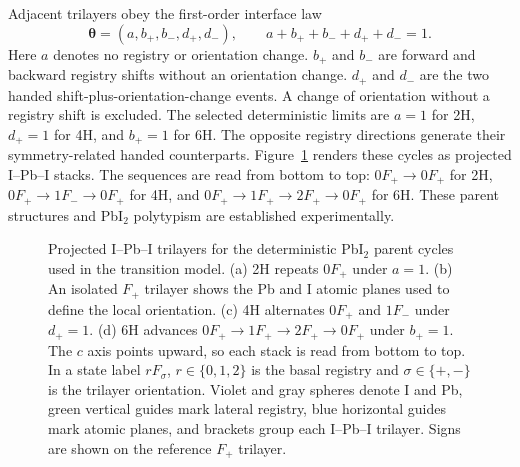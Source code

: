 Adjacent trilayers obey the first-order interface law
\begin{equation}
  \boldsymbol{\theta}=(a,b_+,b_-,d_+,d_-),\qquad
  a+b_++b_-+d_++d_-=1.
  \label{eq:pbi2_transition_probabilities}
\end{equation}
Here $a$ denotes no registry or orientation change. $b_+$ and $b_-$ are
forward and backward registry shifts without an orientation change.
$d_+$ and $d_-$ are the two handed shift-plus-orientation-change events.  A
change of orientation without a registry shift is excluded.  The selected
deterministic limits are $a=1$ for 2H, $d_+=1$ for 4H, and $b_+=1$ for 6H.
The opposite registry directions generate their symmetry-related handed
counterparts.  Figure~\ref{fig:pbi2_transition_states} renders these cycles as
projected I--Pb--I stacks. The sequences are read from bottom to top: $0F_+\rightarrow0F_+$ for 2H,
$0F_+\rightarrow1F_-\rightarrow0F_+$ for 4H, and
$0F_+\rightarrow1F_+\rightarrow2F_+\rightarrow0F_+$ for 6H.  These parent
structures and PbI$_2$ polytypism are established experimentally.\cite{Minagawa1975,Palosz1990}

\begin{figure}[H]
	\centering
	\resizebox{0.88\linewidth}{!}{%
	}
	\caption{Projected I--Pb--I trilayers for the deterministic PbI$_2$ parent
		cycles used in the transition model. (a) 2H repeats $0F_+$ under $a=1$.
		(b) An isolated $F_+$ trilayer shows the Pb and I atomic planes used to
		define the local orientation. (c) 4H alternates $0F_+$ and $1F_-$ under
		$d_+=1$. (d) 6H advances
		$0F_+\rightarrow1F_+\rightarrow2F_+\rightarrow0F_+$ under $b_+=1$.
		The $c$ axis points upward, so each stack is read from bottom to top. In a
		state label $rF_\sigma$, $r\in\{0,1,2\}$ is the basal registry and
		$\sigma\in\{+,-\}$ is the trilayer orientation. Violet and gray spheres
		denote I and Pb, green vertical guides mark lateral registry, blue
		horizontal guides mark atomic planes, and brackets group each I--Pb--I
		trilayer. Signs are shown on the reference $F_+$ trilayer.}
	\label{fig:pbi2_transition_states}
\end{figure}

